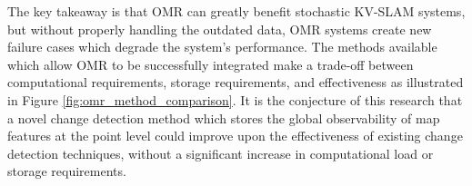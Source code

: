 The key takeaway is that OMR can greatly benefit stochastic KV-SLAM systems, but without properly handling the outdated data, OMR systems create new failure cases which degrade the system's performance. The methods available which allow OMR to be successfully integrated make a trade-off between computational requirements, storage requirements, and effectiveness as illustrated in Figure \ref{fig:omr_method_comparison}. It is the conjecture of this research that a novel change detection method which stores the global observability of map features at the point level could improve upon the effectiveness of existing change detection techniques, without a significant increase in computational load or storage requirements.